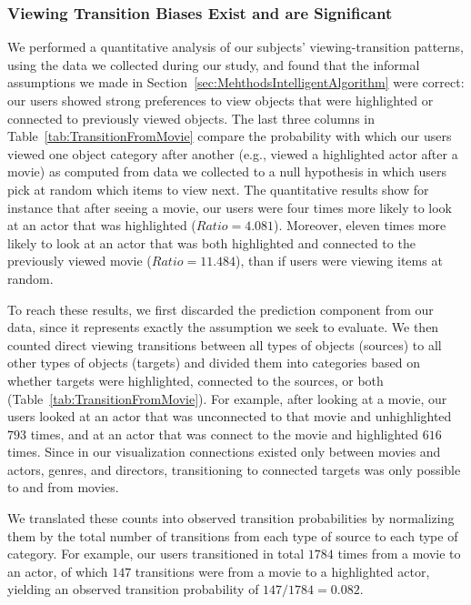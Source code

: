 \subsubsection{Viewing Transition Biases Exist and are Significant}
\label{sec:EvalAssumptionAboutViewingTransition}
We performed a quantitative analysis of our subjects' viewing-transition patterns, using the data we collected during our study, and found that the informal assumptions we made in Section~\ref{sec:MehthodsIntelligentAlgorithm} were correct: our users showed strong preferences to view objects that were highlighted or connected to previously viewed objects. The last three columns in Table~\ref{tab:TransitionFromMovie} compare the probability with which our users viewed one object category after another (e.g., viewed a highlighted actor after a movie) as computed from data we collected to a null hypothesis in which users pick at random which items to view next. The quantitative results show for instance that after seeing a movie, our users were four times more likely to look at an actor that was highlighted ($Ratio = 4.081$). Moreover, eleven times more likely to look at an actor that was both highlighted and connected to the previously viewed movie ($Ratio = 11.484$), than if users were viewing items at random.    


To reach these results, we first discarded the prediction component from our data, since it represents exactly the assumption we seek to evaluate. We then counted direct viewing transitions between all types of objects (sources) to all other types of objects (targets) and divided them into categories based on whether targets were highlighted, connected to the sources, or both (Table~\ref{tab:TransitionFromMovie}).  For example, after looking at a movie, our users looked at an actor that was unconnected to that movie and unhighlighted $793$ times, and at an actor that was connect to the movie and highlighted $616$ times. Since in our visualization connections existed only between movies and actors, genres, and directors, transitioning to connected targets was only possible to and from movies.
    

We translated these counts into observed transition probabilities by normalizing them by the total number of transitions from each type of source to each type of category. For example, our users transitioned in total $1784$ times from a movie to an actor, of which $147$ transitions were from a movie to a highlighted actor, yielding an observed transition probability of $147 / 1784 = 0.082$.

